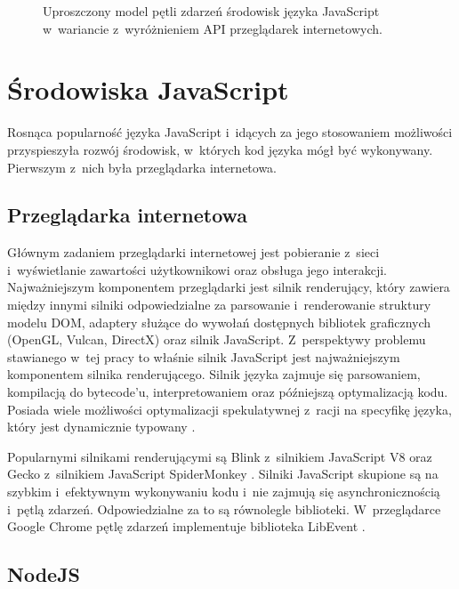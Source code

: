 \begin{figure}
    \centering
    
    \caption{Uproszczony model pętli zdarzeń środowisk języka JavaScript w~wariancie z~wyróżnieniem API przeglądarek internetowych.}
    \label{fig:event-loop}
\end{figure}

\section{Środowiska JavaScript}
\label{sec:env-modules}

Rosnąca popularność języka JavaScript i~idących za jego stosowaniem możliwości przyspieszyła rozwój środowisk, w~których kod języka mógł być wykonywany. Pierwszym z~nich była przeglądarka internetowa. 

\subsection{Przeglądarka internetowa}

Głównym zadaniem przeglądarki internetowej jest pobieranie z~sieci i~wyświetlanie zawartości użytkownikowi oraz obsługa jego interakcji. Najważniejszym komponentem przeglądarki jest silnik renderujący, który zawiera między innymi silniki odpowiedzialne za parsowanie i~renderowanie struktury modelu DOM, adaptery służące do wywołań dostępnych bibliotek graficznych (OpenGL, Vulcan, DirectX) oraz silnik JavaScript. Z~perspektywy problemu stawianego w~tej pracy to właśnie silnik JavaScript jest najważniejszym komponentem silnika renderującego. Silnik języka zajmuje się parsowaniem, kompilacją do bytecode'u, interpretowaniem oraz późniejszą optymalizacją kodu. Posiada wiele możliwości optymalizacji spekulatywnej z~racji na specyfikę języka, który jest dynamicznie typowany \cite{meurer_2017}.

Popularnymi silnikami renderującymi są Blink z~silnikiem JavaScript V8 \cite{V8} oraz Gecko z~silnikiem JavaScript SpiderMonkey \cite{spidermonkey}. Silniki JavaScript skupione są na szybkim i~efektywnym wykonywaniu kodu i~nie zajmują się asynchronicznością i~pętlą zdarzeń. Odpowiedzialne za to są równolegle biblioteki. W~przeglądarce Google Chrome pętlę zdarzeń implementuje biblioteka LibEvent \cite{libevent}.

\subsection{NodeJS}


